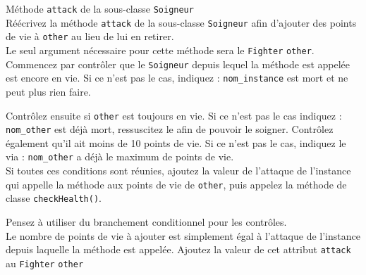 \begin{Exercice}[10 minutes] Méthode \lstinline{attack} de la sous-classe \lstinline{Soigneur} \\

Réécrivez la méthode \lstinline{attack} de la sous-classe \lstinline{Soigneur} afin d'ajouter des points de vie à \lstinline{other} au lieu de lui en retirer. \\

Le seul argument nécessaire pour cette méthode sera le \lstinline{Fighter} \lstinline{other}. \\

Commencez par contrôler que le \lstinline{Soigneur} depuis lequel la méthode est appelée est encore en vie. Si ce n'est pas le cas, indiquez : \lstinline{nom_instance} est mort et ne peut plus rien faire.

Contrôlez ensuite si \lstinline{other} est toujours en vie. Si ce n'est pas le cas indiquez : \lstinline{nom_other} est déjà mort, ressuscitez le afin de pouvoir le soigner. Contrôlez également qu'il ait moins de 10 points de vie. Si ce n'est pas le cas, indiquez le via : \lstinline{nom_other} a déjà le maximum de points de vie. \\

Si toutes ces conditions sont réunies, ajoutez la valeur de l'attaque de l'instance qui appelle la méthode aux points de vie de \lstinline{other}, puis appelez la méthode de classe \lstinline{checkHealth()}.

\begin{conseil}
Pensez à utiliser du branchement conditionnel pour les contrôles. \\

Le nombre de points de vie à ajouter est simplement égal à l'attaque de l'instance depuis laquelle la méthode est appelée. Ajoutez la valeur de cet attribut \lstinline{attack} au \lstinline{Fighter} \lstinline{other}

\end{conseil}

\begin{solution}
	
\end{solution}

\end{Exercice}

